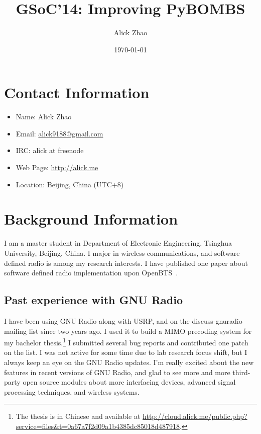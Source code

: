 \documentclass[a4paper]{article}
\begin{document}
\title{GSoC'14: Improving PyBOMBS}
\author{Alick Zhao}
\date{\today}
\maketitle

\section{Contact Information}

\begin{itemize}
  \item Name: Alick Zhao
  \item Email: \url{alick9188@gmail.com}
  \item IRC: alick at freenode
  \item Web Page: \url{http://alick.me}
  \item Location: Beijing, China (UTC+8)
\end{itemize}

\section{Background Information}

I am a master student in Department of Electronic Engineering, Tsinghua
University, Beijing, China. I major in wireless communications, and
software defined radio is among my research interests. I have published
one paper about software defined radio implementation upon
OpenBTS~\cite{zhao2013software}.

\subsection{Past experience with GNU Radio}

I have been using GNU Radio along with USRP, and
on the discuss-gnuradio mailing list since two years ago.
I used it to build a MIMO precoding system for my bachelor thesis.\footnote{%
The thesis is in Chinese and available at %
\url{http://cloud.alick.me/public.php?service=files&t=0a67a7f2d09a1b4385dc85018d487918}.}%
I submitted several bug reports and contributed one patch on the list.
I was not active for some time due to lab research focus shift, but I
always keep an eye on the GNU Radio updates.  I'm really excited about
the new features in recent versions of GNU Radio, and glad to see more and more
third-party open source modules about more interfacing devices, advanced
signal processing techniques, and wireless systems.
\end{document}
